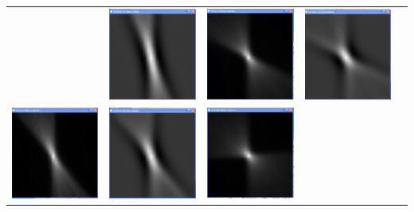 \begin{longtable}{p{3cm}p{3cm}p{3cm}p{3cm}c}
                  & 
                  \includegraphics[width=.2\textwidth, height=0.125\textheight]{pic/Einzelfenster_Bilder/inhomogene_Messung/inhomo2gef_prj.png}
                  &
                  \includegraphics[width=.2\textwidth, height=0.125\textheight]{pic/Einzelfenster_Bilder/isotrope_Messung/iso2einf_rueckprj.png}
                  & 
                  \includegraphics[width=.2\textwidth, height=0.125\textheight]{pic/Einzelfenster_Bilder/isotrope_Messung/iso2gef_prj.png}\\
                  \includegraphics[width=.2\textwidth, height=0.125\textheight]{pic/Einzelfenster_Bilder/inhomogene_Messung/inhomo3einf_rueckprj.png}
                  & 
                  \includegraphics[width=.2\textwidth, height=0.125\textheight]{pic/Einzelfenster_Bilder/inhomogene_Messung/inhomo3gef_prj.png}
                  &
                  \includegraphics[width=.2\textwidth, height=0.125\textheight]{pic/Einzelfenster_Bilder/isotrope_Messung/iso3einf_rueckprj.png}

\end{longtable}
